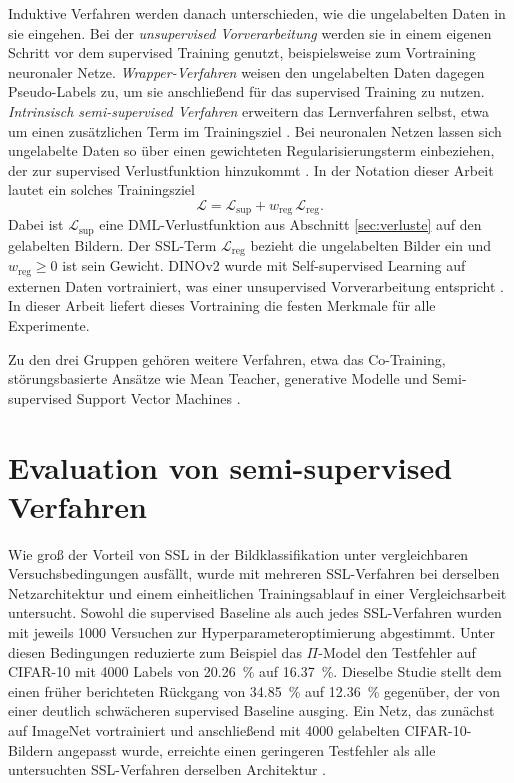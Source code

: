 Induktive Verfahren werden danach unterschieden, wie die ungelabelten Daten in sie eingehen. Bei der \emph{unsupervised Vorverarbeitung} werden sie in einem eigenen Schritt vor dem supervised Training genutzt, beispielsweise zum Vortraining neuronaler Netze. \emph{Wrapper-Verfahren} weisen den ungelabelten Daten dagegen Pseudo-Labels zu, um sie anschließend für das supervised Training zu nutzen. \emph{Intrinsisch semi-supervised Verfahren} erweitern das Lernverfahren selbst, etwa um einen zusätzlichen Term im Trainingsziel \cite{van_engelen_survey_2019}. Bei neuronalen Netzen lassen sich ungelabelte Daten so über einen gewichteten Regularisierungsterm einbeziehen, der zur supervised Verlustfunktion hinzukommt \cite{weston_deep_2012, hoffer_semi-supervised_2018}. In der Notation dieser Arbeit lautet ein solches Trainingsziel \cite{weston_deep_2012, hoffer_semi-supervised_2018}
\begin{equation}
  \mathcal{L}=\mathcal{L}_{\mathrm{sup}}+w_{\mathrm{reg}}\,\mathcal{L}_{\mathrm{reg}}.
  \label{eq:ssl:ziel}
\end{equation}
Dabei ist $\mathcal{L}_{\mathrm{sup}}$ eine \ac{DML}-Verlustfunktion aus Abschnitt \ref{sec:verluste} auf den gelabelten Bildern. Der \ac{SSL}-Term $\mathcal{L}_{\mathrm{reg}}$ bezieht die ungelabelten Bilder ein und $w_{\mathrm{reg}}\ge0$ ist sein Gewicht. DINOv2 wurde mit Self-supervised Learning auf externen Daten vortrainiert, was einer unsupervised Vorverarbeitung entspricht \cite{oquab_dinov2_2023}. In dieser Arbeit liefert dieses Vortraining die festen Merkmale für alle Experimente.

Zu den drei Gruppen gehören weitere Verfahren, etwa das Co-Training, störungsbasierte Ansätze wie Mean Teacher, generative Modelle und Semi-supervised Support Vector Machines \cite{van_engelen_survey_2019}. 

\section{Evaluation von semi-supervised Verfahren}
\label{sec:ssl:evaluation}

Wie groß der Vorteil von \ac{SSL} in der Bildklassifikation unter vergleichbaren Versuchsbedingungen ausfällt, wurde mit mehreren \ac{SSL}-Verfahren bei derselben Netzarchitektur und einem einheitlichen Trainingsablauf in einer Vergleichsarbeit untersucht. Sowohl die supervised Baseline als auch jedes \ac{SSL}-Verfahren wurden mit jeweils 1000 Versuchen zur Hyperparameteroptimierung abgestimmt. Unter diesen Bedingungen reduzierte zum Beispiel das $\Pi$-Model den Testfehler auf CIFAR-10 mit 4000 Labels von \qty{20.26}{\percent} auf \qty{16.37}{\percent}. Dieselbe Studie stellt dem einen früher berichteten Rückgang von \qty{34.85}{\percent} auf \qty{12.36}{\percent} gegenüber, der von einer deutlich schwächeren supervised Baseline ausging. Ein Netz, das zunächst auf ImageNet vortrainiert und anschließend mit 4000 gelabelten CIFAR-10-Bildern angepasst wurde, erreichte einen geringeren Testfehler als alle untersuchten \ac{SSL}-Verfahren derselben Architektur \cite{oliver_realistic_2018}.

